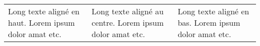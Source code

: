 \begin{tabular}{p{3cm} | m{3cm} | b{3cm}}
	Long texte aligné en haut. Lorem ipsum dolor amat etc. 
	& 
	Long texte aligné au centre. Lorem ipsum dolor amat etc. 
	&
	 Long texte aligné en bas. Lorem ipsum dolor amat etc. \\
\end{tabular}
